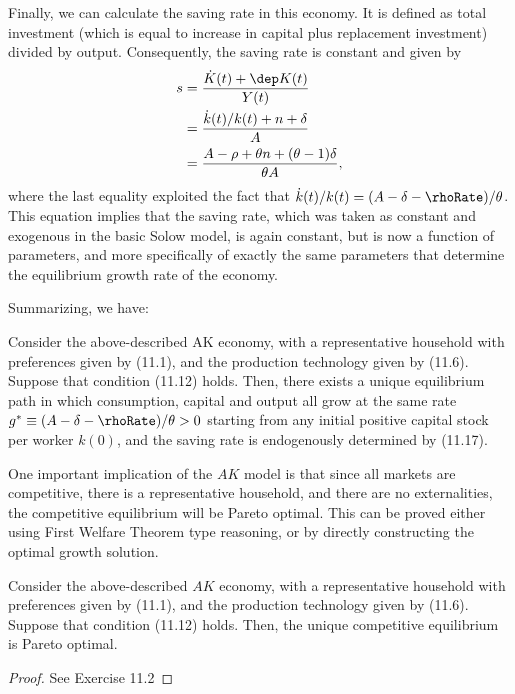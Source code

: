 \documentclass[\topdir/lecture\_notes.tex]{subfiles}
\begin{document}
Finally, we can calculate the saving rate in this economy. It is defined as total investment (which is equal to increase in capital plus replacement investment) divided by output. Consequently, the saving rate is constant and given by
\[
\begin{aligned}
s & =\frac{\dot{K}(t)+\dep K(t)}{Y(t)} \\
& =\frac{\dot{k}(t) / k(t)+n+\delta}{A} \\
& =\frac{A-\rho+\theta n+(\theta-1) \delta}{\theta A},
\end{aligned}
\] where the last equality exploited the fact that $\dot{k}(t) / k(t)=(A-\delta-\rhoRate) / \theta$. This equation implies that the saving rate, which was taken as constant and exogenous in the basic Solow model, is again constant, but is now a function of parameters, and more specifically of exactly the same parameters that determine the equilibrium growth rate of the economy.

Summarizing, we have:
\begin{proposition}
Consider the above-described AK economy, with a representative household with preferences given by (11.1), and the production technology given by (11.6). Suppose that condition (11.12) holds. Then, there exists a unique equilibrium path in which consumption, capital and output all grow at the same rate $g^{*} \equiv(A-\delta-\rhoRate) / \theta>0$ starting from any initial positive capital stock per worker $k(0)$, and the saving rate is endogenously determined by (11.17).
\end{proposition}

One important implication of the $AK$ model is that since all markets are competitive, there is a representative household, and there are no externalities, the competitive equilibrium will be Pareto optimal. This can be proved either using First Welfare Theorem type reasoning, or by directly constructing the optimal growth solution.

\begin{proposition}
Consider the above-described $AK$ economy, with a representative household with preferences given by (11.1), and the production technology given by (11.6). Suppose that condition (11.12) holds. Then, the unique competitive equilibrium is Pareto optimal.
\end{proposition}
\begin{proof}
See Exercise 11.2
\end{proof}
\end{document}
